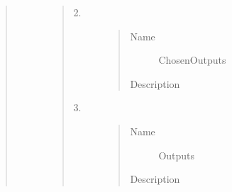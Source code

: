 \documentclass[letterpaper,10pt,english]{sphinxmanual}
\begin{document}
\begin{quote}
\begin{description}
\begin{quote}
\begin{description}
\begin{quote}
\begin{description}
\end{description}\end{quote}

\item[{2.}] \leavevmode\begin{quote}\begin{description}
\item[{Name}] \leavevmode
ChosenOutputs

\item[{Description}] \leavevmode
{}

\end{description}\end{quote}

\item[{3.}] \leavevmode\begin{quote}\begin{description}
\item[{Name}] \leavevmode
Outputs

\item[{Description}] \leavevmode
{}

\end{description}\end{quote}

\end{description}\end{quote}

\end{description}\end{quote}
\end{document}
